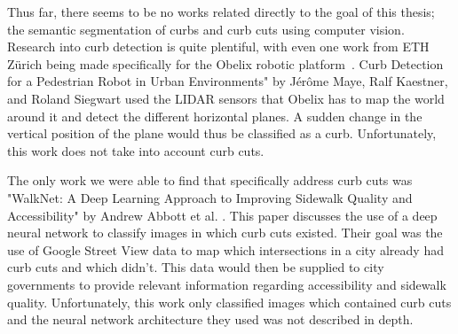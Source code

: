 Thus far, there seems to be no works related directly to the goal of this thesis; the semantic segmentation of curbs and curb cuts using computer vision.
Research into curb detection is quite plentiful, with even one work from ETH Zürich being made specifically for the Obelix robotic platform~\cite{ethobelix}.
Curb Detection for a Pedestrian Robot in Urban Environments" by Jérôme Maye, Ralf Kaestner, and Roland Siegwart used the LIDAR sensors that Obelix has to map the world around it and detect the different horizontal planes.
A sudden change in the vertical position of the plane would thus be classified as a curb.
Unfortunately, this work does not take into account curb cuts.

The only work we were able to find that specifically address curb cuts was "WalkNet: A Deep Learning Approach to Improving Sidewalk Quality and Accessibility" by Andrew Abbott et al. \cite{walknet}.
This paper discusses the use of a deep neural network to classify images in which curb cuts existed.
Their goal was the use of Google Street View data to map which intersections in a city already had curb cuts and which didn't.
This data would then be supplied to city governments to provide relevant information regarding accessibility and sidewalk quality.
Unfortunately, this work only classified images which contained curb cuts and the neural network architecture they used was not described in depth.

%
